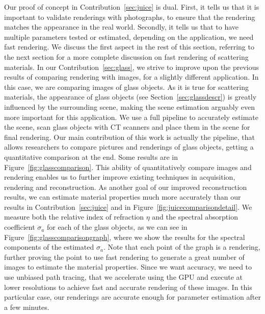 Our proof of concept in Contribution~\ref{sec:juice} is dual. First, it tells us that it is important to validate renderings with photographs, to ensure that the rendering matches the appearance in the real world. Secondly, it tells us that to have multiple parameters tested or estimated, depending on the application, we need fast rendering. We discuss the first aspect in the rest of this section, referring to the next section for a more complete discussion on fast rendering of scattering materials. In our Contribution~\ref{sec:glass}, we strive to improve upon the previous results of comparing rendering with images, for a slightly different application. In this case, we are comparing images of glass objects. As it is true for scattering materials, the appearance of glass objects (see Section~\ref{sec:glassdescr}) is greatly influenced by the surrounding scene, making the scene estimation arguably even more important for this application. We use a full pipeline to accurately estimate the scene, scan glass objects with CT scanners and place them in the scene for final rendering. Our main contribution of this work is actually the pipeline, that allows researchers to compare pictures and renderings of glass objects, getting a quantitative comparison at the end. Some results are in Figure~\ref{fig:glasscomparison}. This ability of quantitatively compare images and rendering enables us to further improve existing techniques in acquisition, rendering and reconstruction. As another goal of our improved reconstruction results, we can estimate material properties much more accurately than our  results in Contribution~\ref{sec:juice} and in Figure~\ref{fig:juicecomparisondetail}. We measure both the relative index of refraction $\eta$ and the spectral absorption coefficient $\sigma_a$ for each of the glass objects, as we can see in Figure~\ref{fig:glasscomparisongraph}, where we show the results for the spectral components of the estimated $\sigma_a$. Note that each point of the graph is a rendering, further proving the point to use fast rendering to generate a great number of images to estimate the material properties. Since we want accuracy, we need to use unbiased path tracing, that we accelerate using the GPU and execute at lower resolutions to achieve fast and accurate rendering of these images. In this particular case, our renderings are accurate enough for parameter estimation after a few minutes. 

